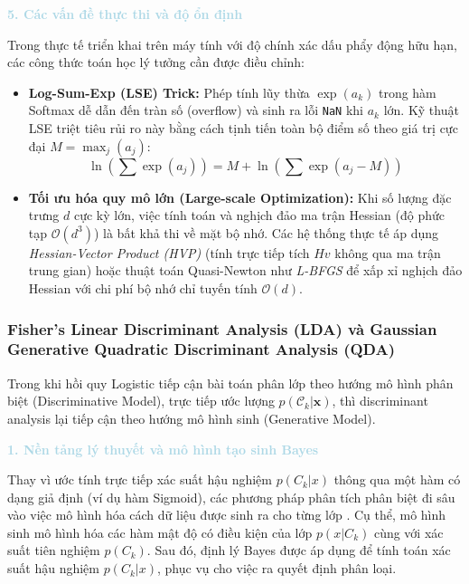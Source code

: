 \vspace{0.5em}
\noindent\textcolor{lightblue}{\textbf{5. Các vấn đề thực thi và độ ổn định}}
\vspace{0.5em}

Trong thực tế triển khai trên máy tính với độ chính xác dấu phẩy động hữu hạn, các công thức toán học lý tưởng cần được điều chỉnh:

\begin{itemize}
    \item \textbf{Log-Sum-Exp (LSE) Trick:} Phép tính lũy thừa $\exp(a_k)$ trong hàm Softmax dễ dẫn đến tràn số (overflow) và sinh ra lỗi \texttt{NaN} khi $a_k$ lớn. Kỹ thuật LSE triệt tiêu rủi ro này bằng cách tịnh tiến toàn bộ điểm số theo giá trị cực đại $M = \max_j(a_j)$:
    \begin{equation}
        \ln\left(\sum \exp(a_j)\right) = M + \ln\left(\sum \exp(a_j - M)\right)
    \end{equation}
    \item \textbf{Tối ưu hóa quy mô lớn (Large-scale Optimization):} Khi số lượng đặc trưng $d$ cực kỳ lớn, việc tính toán và nghịch đảo ma trận Hessian (độ phức tạp $\mathcal{O}(d^3)$) là bất khả thi về mặt bộ nhớ. Các hệ thống thực tế áp dụng \textit{Hessian-Vector Product (HVP)} (tính trực tiếp tích $Hv$ không qua ma trận trung gian) hoặc thuật toán Quasi-Newton như \textit{L-BFGS} để xấp xỉ nghịch đảo Hessian với chi phí bộ nhớ chỉ tuyến tính $\mathcal{O}(d)$.
\end{itemize}

\subsubsection{Fisher's Linear Discriminant Analysis (LDA) và Gaussian Generative Quadratic Discriminant Analysis (QDA)}

Trong khi hồi quy Logistic tiếp cận bài toán phân lớp theo hướng mô hình phân biệt (Discriminative Model), trực tiếp ước lượng $p(\mathcal{C}_k | \mathbf{x})$, thì discriminant analysis lại tiếp cận theo hướng mô hình sinh (Generative Model). 

\vspace{0.5em}
\noindent\textcolor{lightblue}{\textbf{1. Nền tảng lý thuyết và mô hình tạo sinh Bayes}}
\vspace{0.5em}

Thay vì ước tính trực tiếp xác suất hậu nghiệm $p(C_k|x)$ thông qua một hàm có dạng giả định (ví dụ hàm Sigmoid), các phương pháp phân tích phân biệt đi sâu vào việc mô hình hóa cách dữ liệu được sinh ra cho từng lớp \cite{bishop2006pattern}. Cụ thể, mô hình sinh mô hình hóa các hàm mật độ có điều kiện của lớp $p(x|C_k)$ cùng với xác suất tiên nghiệm $p(C_k)$. Sau đó, định lý Bayes được áp dụng để tính toán xác suất hậu nghiệm $p(C_k|x)$, phục vụ cho việc ra quyết định phân loại.

